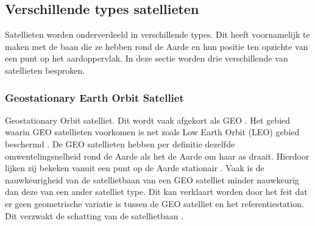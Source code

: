 \subsection{Verschillende types satellieten}
\label{LVTS}
Satellieten worden onderverdeeld in verschillende types. Dit heeft voornamelijk te maken met de baan die ze hebben rond de Aarde en hun positie ten opzichte van een punt op het aardoppervlak. In deze sectie worden drie verschillende van satellieten besproken. 

\subsubsection{Geostationary Earth Orbit Satelliet}
Geostationary Orbit satelliet. Dit wordt vaak afgekort als GEO \cite{LBibGEO,LBibMEO}. Het gebied waarin GEO satellieten voorkomen is net zoals Low Earth Orbit (LEO) gebied beschermd \cite{LBibMEO}. De GEO satellieten hebben per definitie dezelfde omwentelingsnelheid rond de Aarde als het de Aarde om haar as draait. Hierdoor lijken zij bekeken vanuit een punt op de Aarde stationair \cite{LBibGEO}.  Vaak is de nauwkeurigheid van de satellietbaan van een GEO satelliet minder nauwkeurig dan deze van een ander satelliet type. Dit kan verklaart worden door het feit dat er geen geometrische variatie is tussen de GEO satelliet en het referentiestation. Dit verzwakt de schatting van de satellietbaan \cite{LBibPPP2}.

 

